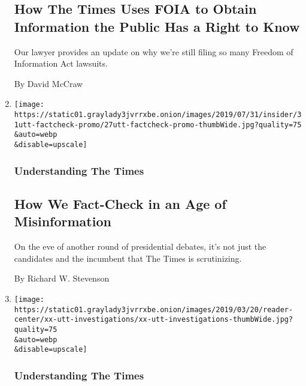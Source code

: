 \begin{enumerate}
{  \subsection{How The Times Uses FOIA to Obtain Information the Public
  Has a Right to
  Know}\label{how-the-times-uses-foia-to-obtain-information-the-public-has-a-right-to-know}}

  Our lawyer provides an update on why we're still filing so many
  Freedom of Information Act lawsuits.

  By David McCraw
\item
  \href{/2019/07/30/reader-center/fact-checking-politics-presidential-election.html}{}

  \texttt{[image: https://static01.graylady3jvrrxbe.onion/images/2019/07/31/insider/31utt-factcheck-promo/27utt-factcheck-promo-thumbWide.jpg?quality=75\\\&auto=webp\\\&disable=upscale]}

  \hypertarget{understanding-the-times-6}{%
  \subsubsection{Understanding The
  Times}\label{understanding-the-times-6}}

  \hypertarget{how-we-fact-check-in-an-age-of-misinformation}{%
  \subsection{How We Fact-Check in an Age of
  Misinformation}\label{how-we-fact-check-in-an-age-of-misinformation}}

  On the eve of another round of presidential debates, it's not just the
  candidates and the incumbent that The Times is scrutinizing.

  By Richard W. Stevenson
\item
  \href{/2019/03/20/reader-center/investigations-explainer.html}{}

  \texttt{[image: https://static01.graylady3jvrrxbe.onion/images/2019/03/20/reader-center/xx-utt-investigations/xx-utt-investigations-thumbWide.jpg?quality=75\\\&auto=webp\\\&disable=upscale]}

  \hypertarget{understanding-the-times-7}{%
  \subsubsection{Understanding The
  Times}\label{understanding-the-times-7}}

  \hypertarget{how-the-times-decides-what-to-investigate}{%
}
\end{enumerate}
